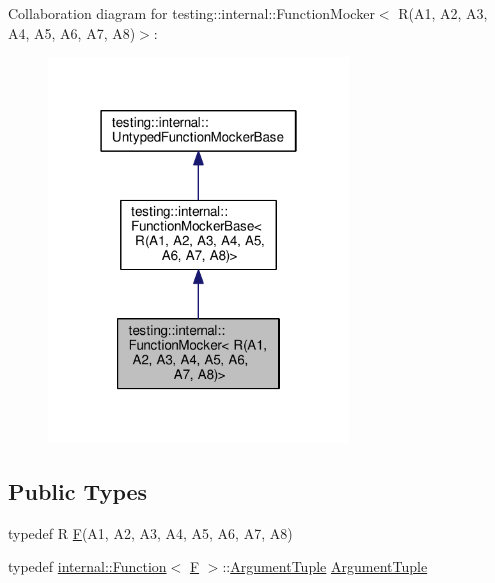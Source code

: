Collaboration diagram for testing\+:\+:internal\+:\+:Function\+Mocker$<$ R(A1, A2, A3, A4, A5, A6, A7, A8)$>$\+:
\nopagebreak
\begin{figure}[H]
\begin{center}
\leavevmode
\includegraphics[width=226pt]{classtesting_1_1internal_1_1FunctionMocker_3_01R_07A1_00_01A2_00_01A3_00_01A4_00_01A5_00_01A6_00_01A7_00_01A8_08_4__coll__graph}
\end{center}
\end{figure}
\subsection*{Public Types}
\begin{DoxyCompactItemize}
\item 
typedef R \hyperlink{classtesting_1_1internal_1_1FunctionMocker_3_01R_07A1_00_01A2_00_01A3_00_01A4_00_01A5_00_01A6_00_01A7_00_01A8_08_4_ad9749c93b0a17540778c5fa162a5fe6c}{F}(A1, A2, A3, A4, A5, A6, A7, A8)
\item 
typedef \hyperlink{structtesting_1_1internal_1_1Function}{internal\+::\+Function}$<$ \hyperlink{classtesting_1_1internal_1_1FunctionMocker_3_01R_07A1_00_01A2_00_01A3_00_01A4_00_01A5_00_01A6_00_01A7_00_01A8_08_4_ad9749c93b0a17540778c5fa162a5fe6c}{F} $>$\+::\hyperlink{classtesting_1_1internal_1_1FunctionMocker_3_01R_07A1_00_01A2_00_01A3_00_01A4_00_01A5_00_01A6_00_01A7_00_01A8_08_4_a57bc2be00815deac8964e2d2ae62fdd2}{Argument\+Tuple} \hyperlink{classtesting_1_1internal_1_1FunctionMocker_3_01R_07A1_00_01A2_00_01A3_00_01A4_00_01A5_00_01A6_00_01A7_00_01A8_08_4_a57bc2be00815deac8964e2d2ae62fdd2}{Argument\+Tuple}
\end{DoxyCompactItemize}
